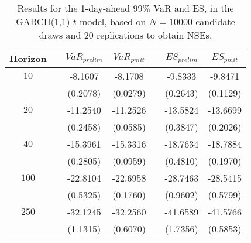 \begin{table}[h] 
\centering 
\caption{Results for the 1-day-ahead $99\%$ VaR and ES, in the GARCH(1,1)-$t$ model, based on $N=10000$ candidate draws and $20$ replications to obtain NSEs.} 
\label{tab:res_pmit_t_garch2_noS} 
\begin{tabular}{ccccccc}  
 Horizon & & $VaR_{prelim}$ & $VaR_{pmit}$ & & $ES_{prelim}$ & $ES_{pmit}$ \\ \hline 
$10$ & & -8.1607 & -8.1708 & & -9.8333 & -9.8471  \\ 
 & & (0.2078) & (0.0279) & & (0.2643) & (0.1129)   \\ [1ex] 
$20$ & & -11.2540 & -11.2526 & & -13.5824 & -13.6699  \\ 
 & & (0.2458) & (0.0585) & & (0.3847) & (0.2026)   \\ [1ex] 
$40$ & & -15.3961 & -15.3316 & & -18.7634 & -18.7884  \\ 
 & & (0.2805) & (0.0959) & & (0.4810) & (0.1970)   \\ [1ex] 
$100$ & & -22.8104 & -22.6958 & & -28.7463 & -28.5415  \\ 
 & & (0.5325) & (0.1760) & & (0.9602) & (0.5799)   \\ [1ex] 
$250$ & & -32.1245 & -32.2560 & & -41.6589 & -41.5766  \\ 
 & & (1.1315) & (0.6070) & & (1.7356) & (0.5853)   \\ [1ex] 
\hline 
\end{tabular} 
\end{table} 
